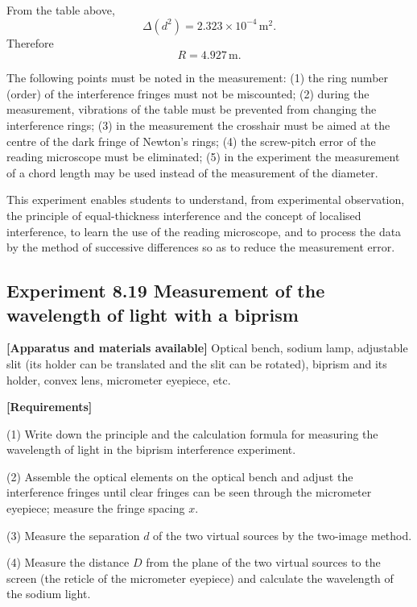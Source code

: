 From the table above,
\[
\Delta(d^2)=2.323\times10^{-4}\,\mathrm{m^2}.
\]
Therefore
\[
R=4.927\,\mathrm{m}.
\]

The following points must be noted in the measurement: (1) the ring number (order) of the interference fringes must not be miscounted; (2) during the measurement, vibrations of the table must be prevented from changing the interference rings; (3) in the measurement the crosshair must be aimed at the centre of the dark fringe of Newton's rings; (4) the screw-pitch error of the reading microscope must be eliminated; (5) in the experiment the measurement of a chord length may be used instead of the measurement of the diameter.

\begin{commentary}
This experiment enables students to understand, from experimental observation, the principle of equal-thickness interference and the concept of localised interference, to learn the use of the reading microscope, and to process the data by the method of successive differences so as to reduce the measurement error.
\end{commentary}

\subsection*{Experiment 8.19 \quad Measurement of the wavelength of light with a biprism}

\textbf{[Apparatus and materials available]} Optical bench, sodium lamp, adjustable slit (its holder can be translated and the slit can be rotated), biprism and its holder, convex lens, micrometer eyepiece, etc.

\textbf{[Requirements]}

(1) Write down the principle and the calculation formula for measuring the wavelength of light in the biprism interference experiment.

(2) Assemble the optical elements on the optical bench and adjust the interference fringes until clear fringes can be seen through the micrometer eyepiece; measure the fringe spacing $x$.

(3) Measure the separation $d$ of the two virtual sources by the two-image method.

(4) Measure the distance $D$ from the plane of the two virtual sources to the screen (the reticle of the micrometer eyepiece) and calculate the wavelength of the sodium light.

